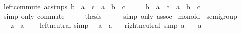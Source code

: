 \begin{isabellebody}
\ left{\isacharunderscore}{\kern0pt}commute\ {\isacharbrackleft}{\kern0pt}ac{\isacharunderscore}{\kern0pt}simps{\isacharbrackright}{\kern0pt}{\isacharcolon}{\kern0pt}\ {\isachardoublequoteopen}b\ \isactrlbold {\isacharasterisk}{\kern0pt}\ {\isacharparenleft}{\kern0pt}a\ \isactrlbold {\isacharasterisk}{\kern0pt}\ c{\isacharparenright}{\kern0pt}\ {\isacharequal}{\kern0pt}\ a\ \isactrlbold {\isacharasterisk}{\kern0pt}\ {\isacharparenleft}{\kern0pt}b\ \isactrlbold {\isacharasterisk}{\kern0pt}\ c{\isacharparenright}{\kern0pt}{\isachardoublequoteclose}\isanewline
%
\isadelimproof
%
\endisadelimproof
%
\isatagproof
{}\isamarkupfalse%
\ {\isacharminus}{\kern0pt}\isanewline
\ \ \isamarkupfalse%
\ {\isachardoublequoteopen}{\isacharparenleft}{\kern0pt}b\ \isactrlbold {\isacharasterisk}{\kern0pt}\ a{\isacharparenright}{\kern0pt}\ \isactrlbold {\isacharasterisk}{\kern0pt}\ c\ {\isacharequal}{\kern0pt}\ {\isacharparenleft}{\kern0pt}a\ \isactrlbold {\isacharasterisk}{\kern0pt}\ b{\isacharparenright}{\kern0pt}\ \isactrlbold {\isacharasterisk}{\kern0pt}\ c{\isachardoublequoteclose}\isanewline
\ \ \ \ \isamarkupfalse%
\ {\isacharparenleft}{\kern0pt}simp\ only{\isacharcolon}{\kern0pt}\ commute{\isacharparenright}{\kern0pt}\isanewline
\ \ \isamarkupfalse%
\ \isamarkupfalse%
\ {\isacharquery}{\kern0pt}thesis\isanewline
\ \ \ \ \isamarkupfalse%
\ {\isacharparenleft}{\kern0pt}simp\ only{\isacharcolon}{\kern0pt}\ assoc{\isacharparenright}{\kern0pt}\isanewline
{}\isamarkupfalse%
%
\endisatagproof
{\isafoldproof}%
%
\isadelimproof
\isanewline
%
\endisadelimproof
\isanewline
{}\isamarkupfalse%
\isanewline
\isanewline
{}\isamarkupfalse%
\ monoid\ {\isacharequal}{\kern0pt}\ semigroup\ {\isacharplus}{\kern0pt}\isanewline
\ \ \ z\ {\isacharcolon}{\kern0pt}{\isacharcolon}{\kern0pt}\ {\isacharprime}{\kern0pt}a\ {\isacharparenleft}{\kern0pt}{\isachardoublequoteopen}\isanewline
\ \ \ left{\isacharunderscore}{\kern0pt}neutral\ {\isacharbrackleft}{\kern0pt}simp{\isacharbrackright}{\kern0pt}{\isacharcolon}{\kern0pt}\ {\isachardoublequoteopen}\ \isactrlbold {\isacharasterisk}{\kern0pt}\ a\ {\isacharequal}{\kern0pt}\ a{\isachardoublequoteclose}\isanewline
\ \ \ right{\isacharunderscore}{\kern0pt}neutral\ {\isacharbrackleft}{\kern0pt}simp{\isacharbrackright}{\kern0pt}{\isacharcolon}{\kern0pt}\ {\isachardoublequoteopen}a\ \isactrlbold {\isacharasterisk}{\kern0pt}\ \ {\isacharequal}{\kern0pt}\ a{\isachardoublequoteclose}\isanewline

\end{isabellebody}
